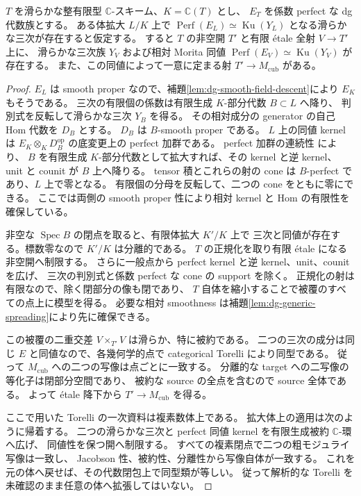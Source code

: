 \begin{lemma}[幾何的一般点からの開上の幾何的模型]
\label{lem:kuznetsov-spread-geometric-model}
$T$ を滑らかな整有限型 $\mathbb C$-スキーム、$K=\mathbb C(T)$ とし、
$E_T$ を係数 perfect な dg 代数族とする。
ある体拡大 $L/K$ 上で
$\operatorname{Perf}(E_L)\simeq\operatorname{Ku}(Y_L)$ となる滑らかな三次が存在すると仮定する。
すると $T$ の非空開 $T'$ と有限 étale 全射 $V\to T'$ 上に、
滑らかな三次族 $Y_V$ および相対 Morita 同値
$\operatorname{Perf}(E_V)\simeq\operatorname{Ku}(Y_V)$ が存在する。
また、この同値によって一意に定まる射 $T'\to M_{\mathrm{cub}}$ がある。
\end{lemma}
\begin{proof}
$E_L$ は smooth proper なので、補題\ref{lem:dg-smooth-field-descent}により $E_K$ もそうである。
三次の有限個の係数は有限生成 $K$-部分代数 $B\subset L$ へ降り、
判別式を反転して滑らかな三次 $Y_B$ を得る。
その相対成分の generator の自己 Hom 代数を $D_B$ とする。
$D_B$ は $B$-smooth proper である。
$L$ 上の同値 kernel は
$E_K\otimes_K D_B^{\mathrm{op}}$ の底変更上の perfect 加群である。
perfect 加群の連続性 \cite[Lemma~2.10]{ToenVaquieObjects} により、
$B$ を有限生成 $K$-部分代数として拡大すれば、その kernel と逆 kernel、
unit と counit が $B$ 上へ降りる。
tensor 積とこれらの射の cone は $B$-perfect であり、$L$ 上で零となる。
有限個の分母を反転して、二つの cone をともに零にできる。
ここでは両側の smooth proper 性により相対 kernel と Hom の有限性を確保している。

非空な $\operatorname{Spec}B$ の閉点を取ると、有限体拡大 $K'/K$ 上で
三次と同値が存在する。標数零なので $K'/K$ は分離的である。
$T$ の正規化を取り有限 étale になる非空開へ制限する。
さらに一般点から perfect kernel と逆 kernel、unit、counit を広げ、
三次の判別式と係数 perfect な cone の support を除く。
正規化の射は有限なので、除く閉部分の像も閉であり、
$T$ 自体を縮小することで被覆のすべての点上に模型を得る。
必要な相対 smoothness は補題\ref{lem:dg-generic-spreading}により先に確保できる。

この被覆の二重交差 $V\times_{T'}V$ は滑らか、特に被約である。
二つの三次の成分は同じ $E$ と同値なので、各幾何学的点で
categorical Torelli \cite[Theorem~1.1]{BMMSCubicTorelli} により同型である。
従って $M_{\mathrm{cub}}$ への二つの写像は点ごとに一致する。
分離的な target への二写像の等化子は閉部分空間であり、
被約な source の全点を含むので source 全体である。
よって étale 降下から $T'\to M_{\mathrm{cub}}$ を得る。

ここで用いた Torelli の一次資料は複素数体上である。
拡大体上の適用は次のように帰着する。
二つの滑らかな三次と perfect 同値 kernel を有限生成被約 $\mathbb C$-環へ広げ、
同値性を保つ開へ制限する。
すべての複素閉点で二つの粗モジュライ写像は一致し、
Jacobson 性、被約性、分離性から写像自体が一致する。
これを元の体へ戻せば、その代数閉包上で同型類が等しい。
従って解析的な Torelli を未確認のまま任意の体へ拡張してはいない。
\end{proof}

